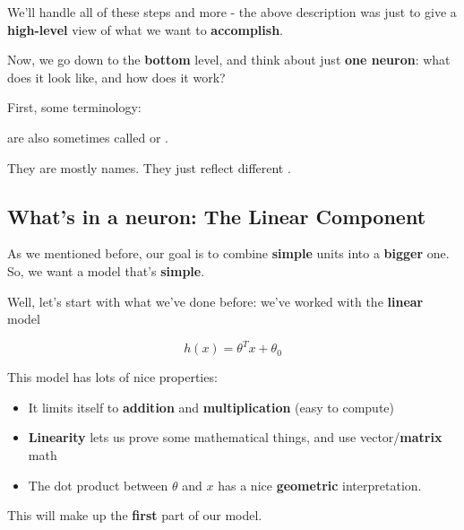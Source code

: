    We'll handle all of these steps and more - the above description was just to give a \textbf{high-level} view of what we want to \textbf{accomplish}. 
    
    Now, we go down to the \textbf{bottom} level, and think about just \textbf{one neuron}: what does it look like, and how does it work?
    
    First, some terminology:\\
    
    \begin{notation}
         are also sometimes called  or .
        
        They are mostly  names. They just reflect different .
    \end{notation}
    
    \subsection{What's in a neuron: The Linear Component}
    
        As we mentioned before, our goal is to combine \textbf{simple} units into a \textbf{bigger} one. So, we want a model that's \textbf{simple}.
        
        Well, let's start with what we've done before: we've worked with the \textbf{linear} model
        
        \begin{equation}
            h(x) = \theta^T x + \theta_0
        \end{equation}
        
        This model has lots of nice properties:
        
        \begin{itemize}
            \item It limits itself to \textbf{addition} and \textbf{multiplication} (easy to compute)
            
            \item \textbf{Linearity} lets us prove some mathematical things, and use vector/\textbf{matrix} math
            
            \item The dot product between $\theta$ and $x$ has a nice \textbf{geometric} interpretation.
        \end{itemize}
        
        This will make up the \textbf{first} part of our model.\\
        
